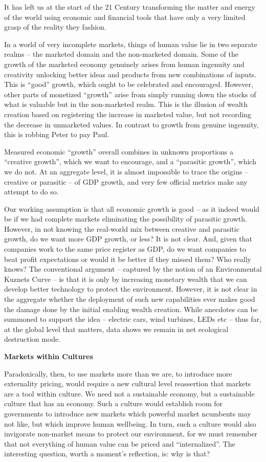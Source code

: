 \documentclass[
]{book}
\begin{document}
It has left us at the start of the 21 Century transforming
the matter and energy of the world using
economic and financial tools that have only
a very limited grasp of the reality they fashion.

In a world of very incomplete markets, things of human value lie in two separate realms -- the
marketed domain and the non-marketed domain. Some of the growth of the marketed
economy genuinely arises from human ingenuity and creativity unlocking better ideas and
products from new combinations of inputs. This is ``good'' growth, which ought to be
celebrated and encouraged. However, other parts of monetized ``growth'' arise from simply
running down the stocks of what is valuable but in the non-marketed realm. This is the illusion
of wealth creation based on registering the increase in marketed value, but not recording the
decrease in unmarketed values. In contrast to growth from genuine ingenuity, this is robbing
Peter to pay Paul.

Measured economic ``growth'' overall combines in unknown proportions a ``creative
growth'', which we want to encourage, and a ``parasitic growth'', which we do not. At an
aggregate level, it is almost impossible to trace the origins -- creative or parasitic -- of GDP
growth, and very few official metrics make any attempt to do so.

Our working assumption is that all
economic growth is good -- as it indeed would be if we had complete markets eliminating the
possibility of parasitic growth. However, in not knowing the real-world mix between creative
and parasitic growth, do we want more GDP growth, or less? It is not clear. And, given that
companies work to the same price register as GDP, do we want companies to beat profit
expectations or would it be better if they missed them? Who really knows?
The conventional argument -- captured by the notion of an Environmental Kuznets Curve -- is
that it is only by increasing monetary wealth that we can develop better technology to protect
the environment. However, it is not clear in the aggregate whether the deployment of such
new capabilities ever makes good the damage done by the initial enabling wealth creation.
While anecdotes can be summoned to support the idea -- electric cars, wind turbines, LEDs
etc -- thus far, at the global level that matters, data shows we remain in net ecological
destruction mode.

\textbf{Markets within Cultures}

Paradoxically, then, to use markets more than we are, to introduce more externality pricing,
would require a new cultural level reassertion that markets are a tool within culture. We need
not a sustainable economy, but a sustainable culture that has an economy. Such a culture
would establish room for governments to introduce new markets which powerful market
ncumbents may not like, but which improve human wellbeing. In turn, such a culture would
also invigorate non-market means to protect our environment, for we must remember that not
everything of human value can be priced and ``internalized''. The interesting question, worth a
moment's reflection, is: why is that?
\end{document}
